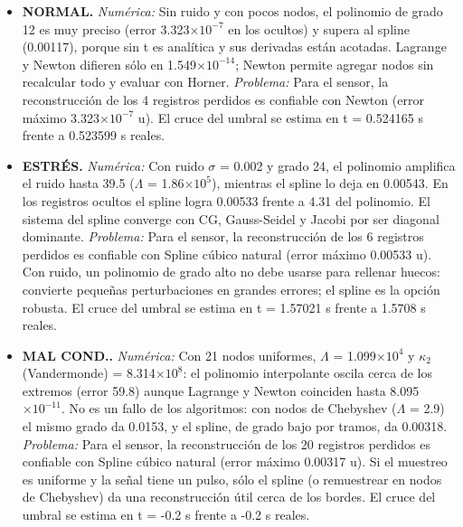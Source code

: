 \begin{itemize}
\item \textbf{NORMAL.} \emph{Numérica:} Sin ruido y con pocos nodos, el polinomio de grado 12 es muy preciso (error 3.323$\times10^{-7}$ en los ocultos) y supera al spline (0.00117), porque sin t es analítica y sus derivadas están acotadas. Lagrange y Newton difieren sólo en 1.549$\times10^{-14}$; Newton permite agregar nodos sin recalcular todo y evaluar con Horner. \emph{Problema:} Para el sensor, la reconstrucción de los 4 registros perdidos es confiable con Newton (error máximo 3.323$\times10^{-7}$ u). El cruce del umbral se estima en t = 0.524165 s frente a 0.523599 s reales.
\item \textbf{ESTRÉS.} \emph{Numérica:} Con ruido $\sigma$ = 0.002 y grado 24, el polinomio amplifica el ruido hasta 39.5 ($\Lambda$ = 1.86$\times10^{5}$), mientras el spline lo deja en 0.00543. En los registros ocultos el spline logra 0.00533 frente a 4.31 del polinomio. El sistema del spline converge con CG, Gauss-Seidel y Jacobi por ser diagonal dominante. \emph{Problema:} Para el sensor, la reconstrucción de los 6 registros perdidos es confiable con Spline cúbico natural (error máximo 0.00533 u). Con ruido, un polinomio de grado alto no debe usarse para rellenar huecos: convierte pequeñas perturbaciones en grandes errores; el spline es la opción robusta. El cruce del umbral se estima en t = 1.57021 s frente a 1.5708 s reales.
\item \textbf{MAL COND..} \emph{Numérica:} Con 21 nodos uniformes, $\Lambda$ = 1.099$\times10^{4}$ y $\kappa_{2}$(Vandermonde) = 8.314$\times10^{8}$: el polinomio interpolante oscila cerca de los extremos (error 59.8) aunque Lagrange y Newton coinciden hasta 8.095$\times10^{-11}$. No es un fallo de los algoritmos: con nodos de Chebyshev ($\Lambda$ = 2.9) el mismo grado da 0.0153, y el spline, de grado bajo por tramos, da 0.00318. \emph{Problema:} Para el sensor, la reconstrucción de los 20 registros perdidos es confiable con Spline cúbico natural (error máximo 0.00317 u). Si el muestreo es uniforme y la señal tiene un pulso, sólo el spline (o remuestrear en nodos de Chebyshev) da una reconstrucción útil cerca de los bordes. El cruce del umbral se estima en t = -0.2 s frente a -0.2 s reales.
\end{itemize}
